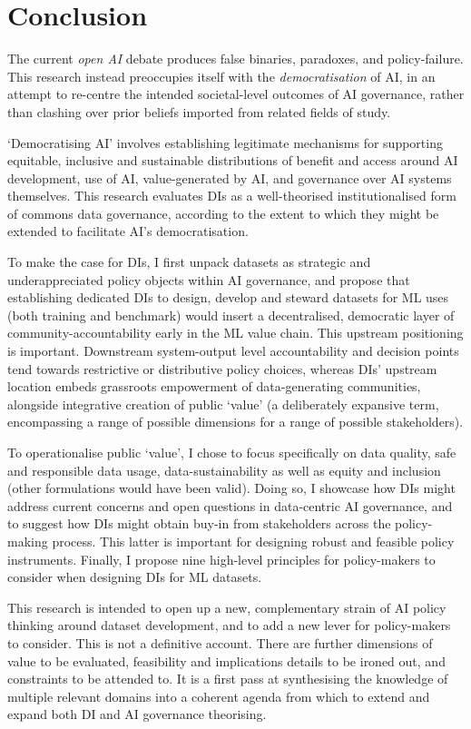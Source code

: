 \chapter*{Conclusion}

The current \textit{open AI} debate produces false binaries, paradoxes, and policy-failure. This research instead preoccupies itself with the \textit{democratisation} of AI, in an attempt to re-centre the intended societal-level outcomes of AI governance, rather than clashing over prior beliefs imported from related fields of study. 

`Democratising AI' involves establishing legitimate mechanisms for supporting equitable, inclusive and sustainable distributions of benefit and access around AI development, use of AI, value-generated by AI, and governance over AI systems themselves. This research evaluates DIs as a well-theorised institutionalised form of commons data governance, according to the extent to which they might be extended to facilitate AI's democratisation.

To make the case for DIs, I first unpack datasets as strategic and underappreciated policy objects within AI governance, and propose that establishing dedicated DIs to design, develop and steward datasets for ML uses (both training and benchmark) would insert a decentralised, democratic layer of community-accountability early in the ML value chain. This upstream positioning is important. Downstream system-output level accountability and decision points tend towards restrictive or distributive policy choices, whereas DIs' upstream location embeds grassroots empowerment of data-generating communities, alongside integrative creation of public ‘value’ (a deliberately expansive term, encompassing a range of possible dimensions for a range of possible stakeholders). 

To operationalise public `value', I chose to focus specifically on data quality, safe and responsible data usage, data-sustainability as well as equity and inclusion (other formulations would have been valid). Doing so, I showcase how DIs might address current concerns and open questions in data-centric AI governance, and to suggest how DIs might obtain buy-in from stakeholders across the policy-making process. This latter is important for designing robust and feasible policy instruments. Finally, I propose nine high-level principles for policy-makers to consider when designing DIs for ML datasets.

This research is intended to open up a new, complementary strain of AI policy thinking around dataset development, and to add a new lever for policy-makers to consider. This is not a definitive account. There are further dimensions of value to be evaluated, feasibility and implications details to be ironed out, and constraints to be attended to. It is a first pass at synthesising the knowledge of multiple relevant domains into a coherent agenda from which to extend and expand both DI and AI governance theorising.